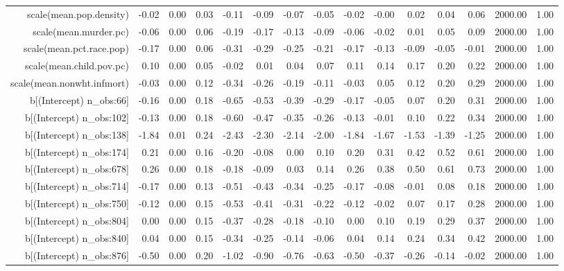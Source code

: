 \begin{table}[ht]
\begin{tabular}{rrrrrrrrrrrrrrr}
  scale(mean.pop.density) & -0.02 & 0.00 & 0.03 & -0.11 & -0.09 & -0.07 & -0.05 & -0.02 & -0.00 & 0.02 & 0.04 & 0.06 & 2000.00 & 1.00 \\ 
  scale(mean.murder.pc) & -0.06 & 0.00 & 0.06 & -0.19 & -0.17 & -0.13 & -0.09 & -0.06 & -0.02 & 0.01 & 0.05 & 0.09 & 2000.00 & 1.00 \\ 
  scale(mean.pct.race.pop) & -0.17 & 0.00 & 0.06 & -0.31 & -0.29 & -0.25 & -0.21 & -0.17 & -0.13 & -0.09 & -0.05 & -0.01 & 2000.00 & 1.00 \\ 
  scale(mean.child.pov.pc) & 0.10 & 0.00 & 0.05 & -0.02 & 0.01 & 0.04 & 0.07 & 0.11 & 0.14 & 0.17 & 0.20 & 0.22 & 2000.00 & 1.00 \\ 
  scale(mean.nonwht.infmort) & -0.03 & 0.00 & 0.12 & -0.34 & -0.26 & -0.19 & -0.11 & -0.03 & 0.05 & 0.12 & 0.20 & 0.29 & 2000.00 & 1.00 \\ 
  b[(Intercept) n\_obs:66] & -0.16 & 0.00 & 0.18 & -0.65 & -0.53 & -0.39 & -0.29 & -0.17 & -0.05 & 0.07 & 0.20 & 0.31 & 2000.00 & 1.00 \\ 
  b[(Intercept) n\_obs:102] & -0.13 & 0.00 & 0.18 & -0.60 & -0.47 & -0.35 & -0.26 & -0.13 & -0.01 & 0.10 & 0.22 & 0.34 & 2000.00 & 1.00 \\ 
  b[(Intercept) n\_obs:138] & -1.84 & 0.01 & 0.24 & -2.43 & -2.30 & -2.14 & -2.00 & -1.84 & -1.67 & -1.53 & -1.39 & -1.25 & 2000.00 & 1.00 \\ 
  b[(Intercept) n\_obs:174] & 0.21 & 0.00 & 0.16 & -0.20 & -0.08 & 0.00 & 0.10 & 0.20 & 0.31 & 0.42 & 0.52 & 0.61 & 2000.00 & 1.00 \\ 
  b[(Intercept) n\_obs:678] & 0.26 & 0.00 & 0.18 & -0.18 & -0.09 & 0.03 & 0.14 & 0.26 & 0.38 & 0.50 & 0.61 & 0.73 & 2000.00 & 1.00 \\ 
  b[(Intercept) n\_obs:714] & -0.17 & 0.00 & 0.13 & -0.51 & -0.43 & -0.34 & -0.25 & -0.17 & -0.08 & -0.01 & 0.08 & 0.18 & 2000.00 & 1.00 \\ 
  b[(Intercept) n\_obs:750] & -0.12 & 0.00 & 0.15 & -0.53 & -0.41 & -0.31 & -0.22 & -0.12 & -0.02 & 0.07 & 0.17 & 0.28 & 2000.00 & 1.00 \\ 
  b[(Intercept) n\_obs:804] & 0.00 & 0.00 & 0.15 & -0.37 & -0.28 & -0.18 & -0.10 & 0.00 & 0.10 & 0.19 & 0.29 & 0.37 & 2000.00 & 1.00 \\ 
  b[(Intercept) n\_obs:840] & 0.04 & 0.00 & 0.15 & -0.34 & -0.25 & -0.14 & -0.06 & 0.04 & 0.14 & 0.24 & 0.34 & 0.42 & 2000.00 & 1.00 \\ 
  b[(Intercept) n\_obs:876] & -0.50 & 0.00 & 0.20 & -1.02 & -0.90 & -0.76 & -0.63 & -0.50 & -0.37 & -0.26 & -0.14 & -0.02 & 2000.00 & 1.00 \\ 

\end{tabular}
\end{table}
